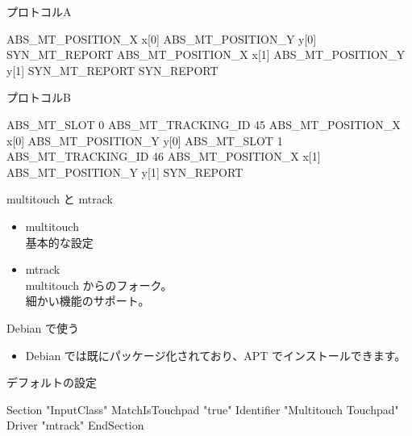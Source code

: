 \begin{frame}[containsverbatim]

プロトコルA
\begin{minipage}[t]{0.4\hsize}
\begin{commandline}
ABS_MT_POSITION_X x[0]
ABS_MT_POSITION_Y y[0]
SYN_MT_REPORT
ABS_MT_POSITION_X x[1]
ABS_MT_POSITION_Y y[1]
SYN_MT_REPORT
SYN_REPORT
\end{commandline}
\end{minipage}

プロトコルB
\begin{minipage}[t]{0.4\hsize}
\begin{commandline}
ABS_MT_SLOT 0
ABS_MT_TRACKING_ID 45
ABS_MT_POSITION_X x[0]
ABS_MT_POSITION_Y y[0]
ABS_MT_SLOT 1
ABS_MT_TRACKING_ID 46
ABS_MT_POSITION_X x[1]
ABS_MT_POSITION_Y y[1]
SYN_REPORT
\end{commandline}
\end{minipage}

\end{frame}

\begin{frame}{multitouch と mtrack}

\begin{itemize}
\item multitouch\\
基本的な設定
\item mtrack\\
multitouch からのフォーク。\\
細かい機能のサポート。\\
\end{itemize}

\end{frame}

\begin{frame}[containsverbatim]{Debian で使う}

\begin{itemize}
\item Debian では既にパッケージ化されており、APT でインストールできます。

\end{itemize}

\end{frame}

\begin{frame}[containsverbatim]{デフォルトの設定}

\begin{commandline}
Section "InputClass"
    MatchIsTouchpad "true"
    Identifier "Multitouch Touchpad"
    Driver "mtrack"
EndSection
\end{commandline} 

\end{frame}

